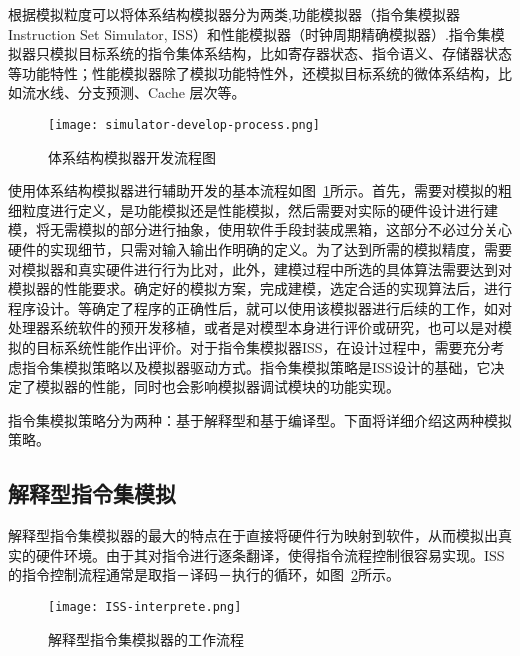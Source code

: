 根据模拟粒度可以将体系结构模拟器分为两类,功能模拟器（指令集模拟器Instruction  Set  Simulator, ISS）和性能模拟器（时钟周期精确模拟器）.指令集模拟器只模拟目标系统的指令集体系结构，比如寄存器状态、指令语义、存储器状态等功能特性；性能模拟器除了模拟功能特性外，还模拟目标系统的微体系结构，比如流水线、分支预测、Cache 层次等\cite{cachecengcideng}。
\begin{figure}[h]
  \centering
  \texttt{[image: simulator-develop-process.png]}
  \caption{体系结构模拟器开发流程图}
  \label{fig:sim-dev-process}
\end{figure}



使用体系结构模拟器进行辅助开发的基本流程如图~\ref{fig:sim-dev-process}所示。首先，需要对模拟的粗细粒度进行定义，是功能模拟还是性能模拟，然后需要对实际的硬件设计进行建模，将无需模拟的部分进行抽象，使用软件手段封装成黑箱，这部分不必过分关心硬件的实现细节，只需对输入输出作明确的定义。为了达到所需的模拟精度，需要对模拟器和真实硬件进行行为比对，此外，建模过程中所选的具体算法需要达到对模拟器的性能要求。确定好的模拟方案，完成建模，选定合适的实现算法后，进行程序设计。等确定了程序的正确性后，就可以使用该模拟器进行后续的工作，如对处理器系统软件的预开发移植，或者是对模型本身进行评价或研究，也可以是对模拟的目标系统性能作出评价。对于指令集模拟器ISS，在设计过程中，需要充分考虑指令集模拟策略以及模拟器驱动方式。指令集模拟策略是ISS设计的基础，它决定了模拟器的性能，同时也会影响模拟器调试模块的功能实现。


指令集模拟策略分为两种：基于解释型和基于编译型。下面将详细介绍这两种模拟策略。



\subsection{解释型指令集模拟}
解释型指令集模拟器的最大的特点在于直接将硬件行为映射到软件\cite{jump}，从而模拟出真实的硬件环境。由于其对指令进行逐条翻译，使得指令流程控制很容易实现。ISS的指令控制流程通常是取指－译码－执行的循环，如图~\ref{fig:ISS-interprete}所示。
\begin{figure}[h]
  \centering
  \texttt{[image: ISS-interprete.png]}
  \caption{解释型指令集模拟器的工作流程}
  \label{fig:ISS-interprete}
\end{figure}


